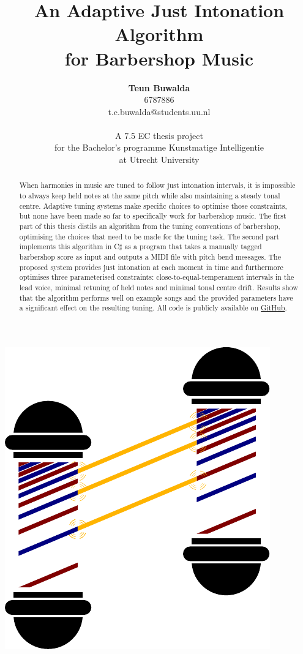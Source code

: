 \documentclass[a4paper]{article}
\title{An Adaptive Just Intonation Algorithm\\for Barbershop Music}
\author{{\bf Teun Buwalda}\\6787886\\t.c.buwalda@students.uu.nl\\
	\\
	A 7.5 EC thesis project\\
	for the Bachelor's programme Kunstmatige Intelligentie\\
	at Utrecht University}
\begin{document}

\begin{titlepage}

\begin{center}
	\includegraphics[height=0.3\textheight]{Figures/poles_logo.pdf}
\end{center}

\vspace{-15pt}

{
	\let\newpage\relax
	\maketitle
}

\thispagestyle{empty}

\begin{abstract}
	When harmonies in music are tuned to follow just intonation intervals, it is impossible to always keep held notes at the same pitch while also maintaining a steady tonal centre. Adaptive tuning systems make specific choices to optimise those constraints, but none have been made so far to specifically work for barbershop music. The first part of this thesis distils an algorithm from the tuning conventions of barbershop, optimising the choices that need to be made for the tuning task. The second part implements this algorithm in C$\sharp$ as a program that takes a manually tagged barbershop score as input and outputs a MIDI file with pitch bend messages. The proposed system provides just intonation at each moment in time and furthermore optimises three parameterised constraints: close-to-equal-temperament intervals in the lead voice, minimal retuning of held notes and minimal tonal centre drift. Results show that the algorithm performs well on example songs and the provided parameters have a significant effect on the resulting tuning. All code is publicly available on \href{https://GitHub.com/teuncb/AdaptiveBarbershop}{GitHub}.
\end{abstract}


\end{titlepage}
\end{document}
